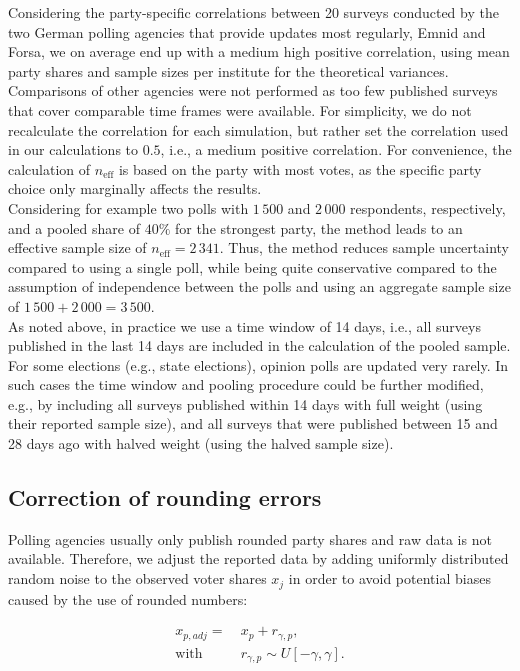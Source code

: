 \documentclass[smallcondensed]{svjour3}     %
\begin{document}
Considering the party-specific correlations between 20 surveys conducted by the
two German polling agencies that provide updates most regularly, Emnid and Forsa,
we on average end up with a medium high positive correlation, using mean party shares and
sample sizes per institute for the theoretical variances. Comparisons of other
agencies were not performed as too few published surveys that
cover comparable time frames were available. For simplicity, we do
not recalculate the correlation for each simulation, but rather set the correlation
used in our calculations to $0.5$, i.e., a medium positive correlation.
For convenience, the calculation of $n_{\text{eff}}$ is based on the party with
most votes, as the specific party choice only marginally affects the results.\\

Considering for example two polls with $1\,500$ and $2\,000$ respondents,
respectively, and a pooled share of $40\%$ for the strongest party, the method
leads to an effective sample size of $n_{\text{eff}} = 2\,341$. Thus, the method
reduces sample uncertainty compared to using a single poll, while being quite
conservative compared to the assumption of independence between the polls and using
an aggregate sample size of $1\,500 + 2\,000 = 3\,500$.\\

As noted above, in practice we use a time window of 14 days, i.e., all surveys
published in the last 14 days are included in the calculation of the pooled
sample. For some elections (e.g., state elections), opinion polls are
updated very rarely. In such cases the time window and pooling procedure
could be further modified, e.g., by including all surveys published within 14 days with full
weight (using their reported sample size), and all surveys that were published
between 15 and 28 days ago with halved weight (using the halved sample size).


\subsection{Correction of rounding errors}\label{ssec:rounding}
Polling agencies usually only publish rounded party shares and
raw data is not available. Therefore, we adjust the reported data by adding
uniformly distributed random noise to the observed voter shares $x_j$ in order
to avoid potential biases caused by the use of rounded numbers:

\begin{equation}
\begin{aligned}
x_{p,adj} = \ &x_p + r_{\gamma,p}, \\
\text{with} \ \ \ \ \ &r_{\gamma,p} \sim U[-\gamma,\gamma].
\end{aligned}
\end{equation}
\end{document}
